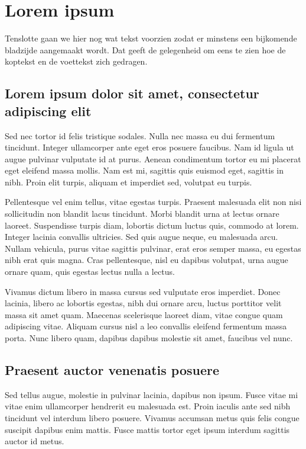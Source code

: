 \section{Lorem ipsum}
Tenslotte gaan we hier nog wat tekst voorzien zodat er minstens een
bijkomende bladzijde aangemaakt wordt. Dat geeft de gelegenheid om eens te
zien hoe de koptekst en de voettekst zich gedragen.

\subsection{Lorem ipsum dolor sit amet, consectetur adipiscing elit}
Sed nec tortor id felis tristique sodales. Nulla nec massa eu dui fermentum
tincidunt. Integer ullamcorper ante eget eros posuere faucibus. Nam id
ligula ut augue pulvinar vulputate id at purus. Aenean condimentum tortor
eu mi placerat eget eleifend massa mollis. Nam est mi, sagittis quis
euismod eget, sagittis in nibh. Proin elit turpis, aliquam et imperdiet
sed, volutpat eu turpis.

Pellentesque vel enim tellus, vitae egestas turpis. Praesent malesuada elit
non nisi sollicitudin non blandit lacus tincidunt. Morbi blandit urna at
lectus ornare laoreet. Suspendisse turpis diam, lobortis dictum luctus
quis, commodo at lorem. Integer lacinia convallis ultricies. Sed quis augue
neque, eu malesuada arcu. Nullam vehicula, purus vitae sagittis pulvinar,
erat eros semper massa, eu egestas nibh erat quis magna. Cras pellentesque,
nisl eu dapibus volutpat, urna augue ornare quam, quis egestas lectus nulla
a lectus.

Vivamus dictum libero in massa cursus sed vulputate eros imperdiet. Donec
lacinia, libero ac lobortis egestas, nibh dui ornare arcu, luctus porttitor
velit massa sit amet quam. Maecenas scelerisque laoreet diam, vitae congue
quam adipiscing vitae. Aliquam cursus nisl a leo convallis eleifend
fermentum massa porta. Nunc libero quam, dapibus dapibus molestie sit amet,
faucibus vel nunc.

\subsection{Praesent auctor venenatis posuere}
Sed tellus augue, molestie in pulvinar lacinia, dapibus non ipsum. Fusce
vitae mi vitae enim ullamcorper hendrerit eu malesuada est. Proin iaculis
ante sed nibh tincidunt vel interdum libero posuere. Vivamus accumsan metus
quis felis congue suscipit dapibus enim mattis. Fusce mattis tortor eget
ipsum interdum sagittis auctor id metus.

